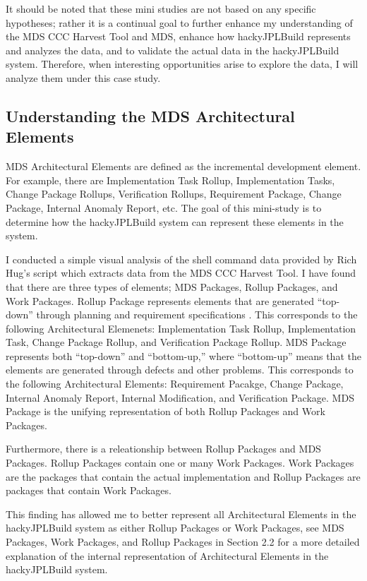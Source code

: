 It should be noted that these mini studies are not based on any specific
hypotheses; rather it is a continual goal to further enhance my
understanding of the MDS CCC Harvest Tool and MDS, enhance how
hackyJPLBuild represents and analyzes the data, and to validate the actual
data in the hackyJPLBuild system.  Therefore, when interesting
opportunities arise to explore the data, I will analyze them under this
case study.

\subsection{Understanding the MDS Architectural Elements}
MDS Architectural Elements are defined as the incremental development
element.  For example, there are Implementation Task Rollup, Implementation 
Tasks, Change Package Rollups, Verification Rollups, Requirement Package,
Change Package, Internal Anomaly Report, etc.  The goal of this mini-study
is to determine how the hackyJPLBuild system can represent these elements
in the system.

I conducted a simple visual analysis of the shell command data provided by
Rich Hug's script which extracts data from the MDS CCC Harvest Tool.  I
have found that there are three types of elements; MDS Packages, Rollup
Packages, and Work Packages.  Rollup Package represents elements 
that are generated ``top-down'' through planning and requirement
specifications \cite{csdl2-02-03}.  This corresponds to the following
Architectural Elemenets: Implementation Task Rollup, Implementation Task,
Change Package Rollup, and Verification Package Rollup.  MDS Package
represents both ``top-down'' and ``bottom-up,'' where ``bottom-up'' means
that the elements are generated through defects and other problems.  This
corresponds to the following Architectural Elements: Requirement Pacakge,
Change Package, Internal Anomaly Report, Internal Modification, and
Verification Package.  MDS Package is the unifying representation of both
Rollup Packages and Work Packages.

Furthermore, there is a releationship between Rollup Packages and MDS
Packages.  Rollup Packages contain one or many Work Packages.  Work
Packages are the packages that contain the actual implementation and Rollup 
Packages are packages that contain Work Packages.

This finding has allowed me to better represent all Architectural Elements
in the hackyJPLBuild system as either Rollup Packages or Work Packages, see 
MDS Packages, Work Packages, and Rollup Packages in Section 2.2 for a more
detailed explanation of the internal representation of Architectural
Elements in the hackyJPLBuild system.



